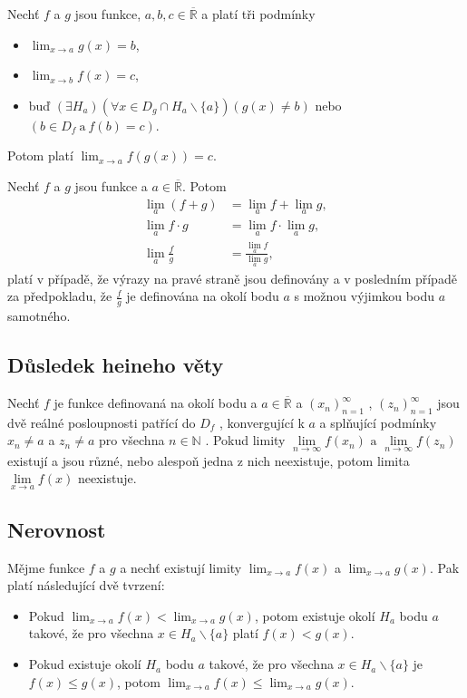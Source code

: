 \documentclass{szzclass}
\begin{document}
\newpage

Nechť $f$ a $g$ jsou funkce,
$a,b,c \in \overline{\mathbb{R}}$ a platí tři podmínky
\begin{itemize}
    \item $\displaystyle\lim_{x\to a} g(x) = b$,
    \item $\displaystyle\lim_{x\to b} f(x) = c$,
    \item buď $(\exists H_a)(\forall x\in D_g\cap H_a \backslash \{a\})(g(x) \neq b)$ nebo $(b\in D_f \ \text{a} \ f(b) = c)$.
\end{itemize}
Potom platí  $\displaystyle\lim_{x\to a} f(g(x)) = c$.


Nechť $f$ a $g$ jsou funkce a
$a \in \overline{\mathbb{R}}$. Potom
\begin{equation*}
\begin{aligned} \lim_a (f + g) &= \lim_a f + \lim_a g, \\ \lim_a f \cdot g &= \lim_a f \cdot \lim_a g, \\ \lim_a \frac{f}{g} &= \frac{\lim_a f}{\lim_a g}, \end{aligned}\end{equation*}
platí v případě, že výrazy na pravé straně jsou definovány a v posledním případě za předpokladu, že
$\frac{f}{g}$
je definována na okolí bodu
$a$
s možnou výjimkou bodu
$a$
samotného.

\subsection{Důsledek heineho věty}
Nechť
$f$
 je funkce definovaná na okolí bodu
a
$a\in\overline{\mathbb{R}}$
 a
$(x_n)_{n=1}^\infty$
,
$(z_n)_{n=1}^\infty$
 jsou dvě reálné posloupnosti patřící do
$D_f$
, konvergující k
$a$
 a splňující podmínky
$x_n\neq a$
 a
 $z_n\neq a$
 pro všechna
$n\in\mathbb{N}$
. Pokud limity
$\lim\limits_{n\to\infty} f(x_n) \textrm{ a } \lim\limits_{n\to\infty} f(z_n)$
existují a jsou různé, nebo alespoň jedna z nich neexistuje, potom limita
$\lim\limits_{x \rightarrow a} f(x)$
neexistuje.

\subsection{Nerovnost}

Mějme funkce $f$ a
$g$ a nechť existují limity
$\displaystyle\lim_{x\to a} f(x)$ a
$\displaystyle\lim_{x\to a} g(x)$.
Pak platí následující dvě tvrzení:
\begin{itemize}
    \item Pokud $\displaystyle\lim_{x\to a} f(x) < \lim_{x\to a} g(x)$,
    potom existuje okolí $H_a$ bodu $a$ takové, že pro všechna
    $x\in H_a \backslash\{a\}$ platí $f(x) < g(x)$.
    \item Pokud existuje okolí $H_a$ bodu $a$ takové, že pro všechna
    $x\in H_a \backslash\{a\}$ je $f(x) \leq g(x)$, potom
    $\displaystyle \lim_{x\to a} f(x) \leq \lim_{x\to a} g(x)$.
\end{itemize}
\end{document}
